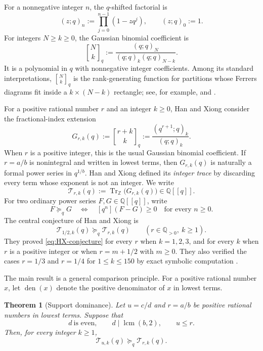 \documentclass[11pt]{amsart}
\newcommand{\Q}{\mathbb{Q}}
\newcommand{\Z}{\mathbb{Z}}
\newcommand{\TrZ}{\operatorname{Tr}_{\Z}}
\newcommand{\den}{\operatorname{den}}
\newcommand{\T}{\mathcal{T}}
\newcommand{\qbinom}[2]{\genfrac{[}{]}{0pt}{}{#1}{#2}_{q}}
\newcommand{\coeff}[2]{[q^{#1}]#2}
\newcommand{\geqcoef}{\succeq_q}
\theoremstyle{plain}
\newtheorem{theorem}{Theorem}
\theoremstyle{definition}
\begin{document}
For a nonnegative integer $n$, the $q$-shifted factorial is
\[
  (z;q)_n:=\prod_{j=0}^{n-1}(1-zq^j),
  \qquad (z;q)_0:=1.
\]
For integers $N\geq k\geq 0$, the Gaussian binomial coefficient is
\[
  \qbinom{N}{k}
  :=\frac{(q;q)_N}{(q;q)_k(q;q)_{N-k}}.
\]
It is a polynomial in $q$ with nonnegative integer coefficients.  Among its
standard interpretations, $\qbinom{N}{k}$ is the rank-generating function for
partitions whose Ferrers diagrams fit inside a $k\times (N-k)$ rectangle; see,
for example, \cite[Chapter 3]{Andrews} and \cite[Section 1.7]{Stanley}.

For a positive rational number $r$ and an integer $k\geq 0$, Han and Xiong
\cite{HanXiong} consider the fractional-index extension
\begin{equation}\label{eq:generalized-qbinom}
  G_{r,k}(q)
  :=\qbinom{r+k}{k}
  :=\frac{(q^{r+1};q)_k}{(q;q)_k}.
\end{equation}
When $r$ is a positive integer, this is the usual Gaussian binomial
coefficient.  If $r=a/b$ is nonintegral and written in lowest terms, then
$G_{r,k}(q)$ is naturally a formal power series in $q^{1/b}$.  Han and Xiong
defined its \emph{integer trace} by discarding every term whose exponent is not
an integer.  We write
\[
  \T_{r,k}(q):=\TrZ\bigl(G_{r,k}(q)\bigr)\in\Q[[q]].
\]
For two ordinary power series $F,G\in\Q[[q]]$, write
\[
  F\geqcoef G
  \quad\Longleftrightarrow\quad
  \coeff{n}{(F-G)}\geq 0\quad\text{for every }n\geq 0.
\]
The central conjecture of Han and Xiong is
\begin{equation}\label{eq:HX-conjecture}
  \T_{1/2,k}(q)\geqcoef \T_{r,k}(q)
  \qquad(r\in\Q_{>0},\ k\geq 1).
\end{equation}
They proved \eqref{eq:HX-conjecture} for every $r$ when $k=1,2,3$, and for
every $k$ when $r$ is a positive integer or when $r=m+1/2$ with
$m\geq 0$.  They also verified the cases $r=1/3$ and $r=1/4$ for
$1\leq k\leq 150$ by exact symbolic computation \cite{HanXiong}.

The main result is a general comparison principle.  For a positive rational
number $x$, let $\den(x)$ denote the positive denominator of $x$ in lowest
terms.

\begin{theorem}[Support dominance]\label{thm:support-dominance}
Let $u=c/d$ and $r=a/b$ be positive rational numbers in lowest terms.  Suppose
that
\begin{equation}\label{eq:dominance-hypotheses}
  d\ \text{is even},
  \qquad d\mid \operatorname{lcm}(b,2),
  \qquad u\leq r.
\end{equation}
Then, for every integer $k\geq 1$,
\[
  \T_{u,k}(q)\geqcoef \T_{r,k}(q).
\]
\end{theorem}
\end{document}
